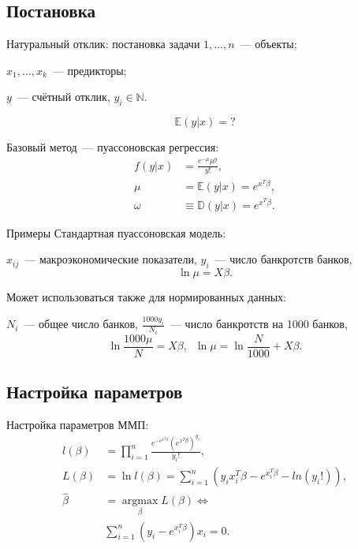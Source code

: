 \documentclass[9pt,pdf,utf8,hyperref={unicode},aspectratio=169]{beamer}
\def\argmax#1{ \mathop{\text{argmax}}\limits_{#1} }
\begin{document}
\subsection{Постановка}
\begin{frame}{Натуральный отклик: постановка задачи}
	$1,\dots,n$~--- объекты;
	
	$x_1,\dots,x_k$~--- предикторы;
	
	$y$~--- счётный отклик, $y_i \in \mathbb{N}$.
	
	$$\mathbb{E}\left(y\left|x\right.\right)=?$$
	
	\bigskip
	
	Базовый метод~--- пуассоновская регрессия:
	\begin{align*}
	f\left(y\left|x\right.\right)          &= \frac{e^{-\mu}\mu^y}{y!}, \\
	\mu                                    &= \mathbb{E}\left(y\left|x\right.\right) = e^{x^T\beta}, \\
	\omega                                 &\equiv \mathbb{D}\left(y\left|x\right.\right) = e^{x^T\beta}.
	\end{align*}
\end{frame}

\begin{frame}{Примеры}
	Стандартная пуассоновская модель: 
	
	$x_{ij}$~--- макроэкономические показатели, $y_i$~--- число банкротств банков, $$\ln \mu = X\beta.$$
	
	\bigskip
	
	Может использоваться также для нормированных данных: 
	
	$N_i$~--- общее число банков, $\frac{1000y_i}{N_i}$~--- число банкротств на 1000 банков,
	$$\ln \frac{1000\mu}{N} = X\beta, \;\; \ln \mu = \ln \frac{N}{1000} + X\beta.$$
\end{frame}



\subsection{Настройка параметров}
\begin{frame}{Настройка параметров}
	ММП:
	\begin{align*}
	l\left(\beta\right) &= \prod_{i=1}^n \frac{e^{-e^{x^T\beta}} \left(e^{x^T\beta}\right)^{y_i}}{y_i!},\\
	L\left(\beta\right) &= \ln l\left(\beta\right) = \sum\limits_{i=1}^n \left( y_i x_i^T\beta - e^{x_i^T\beta} - ln \left(y_i!\right)\right), \\
	\hat{\beta}         &= \argmax{\beta} L\left(\beta\right) \Leftrightarrow \\
	& \sum_{i=1}^n \left(y_i - e^{x_i^T\beta}\right)x_i = 0.
	\end{align*}
\end{frame}
\end{document}
